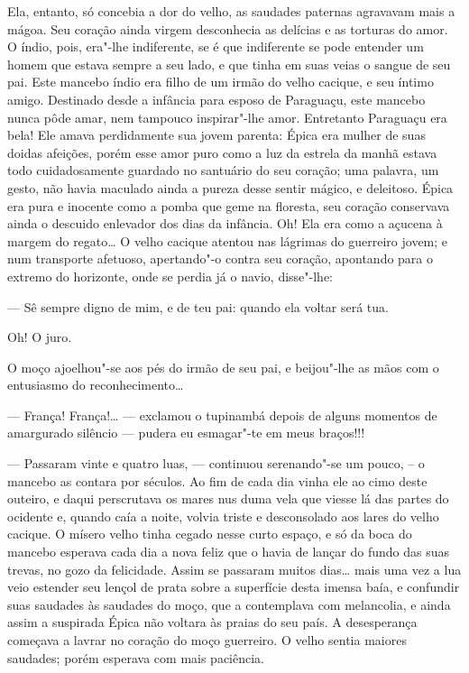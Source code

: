 Ela, entanto, só concebia a dor do velho, as saudades paternas agravavam
mais a mágoa. Seu coração ainda virgem desconhecia as delícias e as
torturas do amor. O índio, pois, era"-lhe indiferente, se é que
indiferente se pode entender um homem que estava sempre a seu lado, e
que tinha em suas veias o sangue de seu pai. Este mancebo índio era
filho de um irmão do velho cacique, e seu íntimo amigo. Destinado desde
a infância para esposo de Paraguaçu, este mancebo nunca pôde amar, nem
tampouco inspirar"-lhe amor. Entretanto Paraguaçu era bela! Ele amava
perdidamente sua jovem parenta: Épica era mulher de suas doidas
afeições, porém esse amor puro como a luz da estrela da manhã estava
todo cuidadosamente guardado no santuário do seu coração; uma palavra,
um gesto, não havia maculado ainda a pureza desse sentir mágico, e
deleitoso. Épica era pura e inocente como a pomba que geme na floresta,
seu coração conservava ainda o descuido enlevador dos dias da infância.
Oh! Ela era como a açucena à margem do regato\ldots{} O velho cacique atentou
nas lágrimas do guerreiro jovem; e num transporte afetuoso, apertando"-o
contra seu coração, apontando para o extremo do horizonte, onde se
perdia já o navio, disse"-lhe:

--- Sê sempre digno de mim, e de teu pai: quando ela voltar será tua.

Oh! O juro.

O moço ajoelhou"-se aos pés do irmão de seu pai, e beijou"-lhe as mãos com
o entusiasmo do reconhecimento\ldots{}

--- França! França!\ldots{} --- exclamou o tupinambá depois de alguns momentos
de amargurado silêncio --- pudera eu esmagar"-te em meus braços!!!

--- Passaram vinte e quatro luas, --- continuou serenando"-se um pouco, --
o mancebo as contara por séculos. Ao fim de cada dia vinha ele ao cimo
deste outeiro, e daqui perscrutava os mares nus duma vela que viesse lá
das partes do ocidente e, quando caía a noite, volvia triste e
desconsolado aos lares do velho cacique. O mísero velho tinha cegado
nesse curto espaço, e só da boca do mancebo esperava cada dia a nova
feliz que o havia de lançar do fundo das suas trevas, no gozo da
felicidade. Assim se passaram muitos dias\ldots{} mais uma vez a lua veio
estender seu lençol de prata sobre a superfície desta imensa baía, e
confundir suas saudades às saudades do moço, que a contemplava com
melancolia, e ainda assim a suspirada Épica não voltara às praias do seu
país. A desesperança começava a lavrar no coração do moço guerreiro. O
velho sentia maiores saudades; porém esperava com mais paciência.


